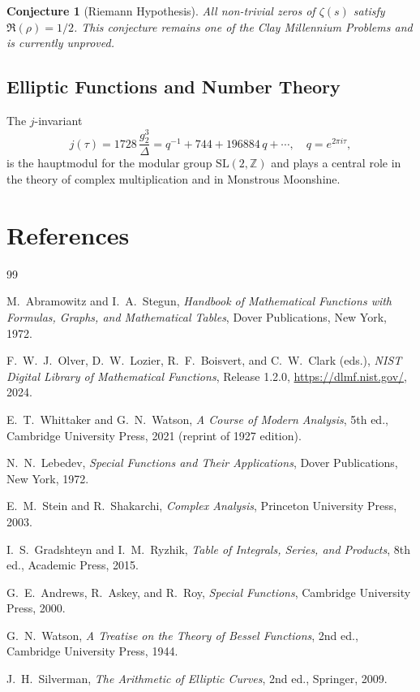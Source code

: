 \documentclass[12pt,a4paper]{amsart}
\newtheorem{conjecture}[theorem]{Conjecture}
\theoremstyle{definition}
\begin{document}
\begin{conjecture}[Riemann Hypothesis]
All non-trivial zeros of \(\zeta(s)\) satisfy \(\Re(\rho) = 1/2\).
This conjecture remains one of the Clay Millennium Problems and is currently unproved.
\end{conjecture}

\subsection{Elliptic Functions and Number Theory}

The \(j\)-invariant
\[
  j(\tau) = 1728\,\frac{g_2^3}{\Delta} = q^{-1} + 744 + 196884\,q + \cdots,
  \quad q = e^{2\pi i\tau},
\]
is the hauptmodul for the modular group \(\mathrm{SL}(2,\mathbb{Z})\) and plays a central
role in the theory of complex multiplication and in Monstrous Moonshine.

\section{References}

\begin{thebibliography}{99}

M.~Abramowitz and I.~A.~Stegun,
\textit{Handbook of Mathematical Functions with Formulas, Graphs, and Mathematical Tables},
Dover Publications, New York, 1972.

F.~W.~J.~Olver, D.~W.~Lozier, R.~F.~Boisvert, and C.~W.~Clark (eds.),
\textit{NIST Digital Library of Mathematical Functions},
Release 1.2.0, \url{https://dlmf.nist.gov/}, 2024.

E.~T.~Whittaker and G.~N.~Watson,
\textit{A Course of Modern Analysis}, 5th ed.,
Cambridge University Press, 2021 (reprint of 1927 edition).

N.~N.~Lebedev,
\textit{Special Functions and Their Applications},
Dover Publications, New York, 1972.

E.~M.~Stein and R.~Shakarchi,
\textit{Complex Analysis},
Princeton University Press, 2003.

I.~S.~Gradshteyn and I.~M.~Ryzhik,
\textit{Table of Integrals, Series, and Products}, 8th ed.,
Academic Press, 2015.

G.~E.~Andrews, R.~Askey, and R.~Roy,
\textit{Special Functions},
Cambridge University Press, 2000.

G.~N.~Watson,
\textit{A Treatise on the Theory of Bessel Functions}, 2nd ed.,
Cambridge University Press, 1944.

J.~H.~Silverman,
\textit{The Arithmetic of Elliptic Curves}, 2nd ed.,
Springer, 2009.

\end{thebibliography}
\end{document}
